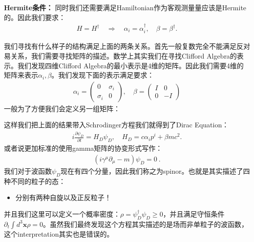 \textbf{Hermite条件：}
同时我们还需要满足Hamiltonian作为客观测量量应该是Hermite的。因此我们要求：
\begin{align}
  H = H^\dagger \quad \Rightarrow \quad \alpha_i = \alpha_i^\dagger,
  \quad \beta = \beta^\dagger.
\end{align}

\bigskip
{}

我们寻找有什么样子的结构满足上面的两条关系。首先一般复数完全不能满足反对易关系，我们需要寻找矩阵的描述。数学上其实我们在寻找Clifford
Algebra的表示。我们发现四维Clifford Algebra的最小表示是4维的矩阵。因此我们需要4维的矩阵来表示$
\alpha_i, \beta $。我们发现下面的表示满足要求：
\begin{align}
  \alpha_i=
  \begin{pmatrix}0&\sigma_i\\ \sigma_i&0
  \end{pmatrix},\quad\beta=
  \begin{pmatrix}I&0\\0&-I
  \end{pmatrix}
\end{align}
一般为了方便我们会定义另一组矩阵：

\bigskip
{}

这样我们把上面的结果带入Schrodinger方程我们就得到了Dirac Equation：
\begin{align}
  i\frac{\partial\psi_D}{\partial t}=H_D\psi_D,\quad H_D=c \alpha_i
  p^i+\beta mc^2.
\end{align}
或者说更加标准的使用gamma矩阵的协变形式写作：
\begin{align}
  (i\gamma^\mu \partial_\mu - m)\psi_D=0\mathrm{~.}
\end{align}
我们对于波函数$ \psi_D $现在有四个分量，因此我们称之为spinor。也就是其实描述了四种不同的粒子的态：
\begin{itemize}
  \item 分别有两种自旋以及正反粒子！
\end{itemize}
并且我们这里可以定义一个概率密度：$ \rho = \psi_D^\dagger \psi_D \geq 0 $，并且满足守恒条件$
\partial_t \int d^3\mathbf{x} \rho = 0
$。虽然我们最终发现这个方程其实描述的是场而非单粒子的波函数，这个interpretation其实也是错误的。

